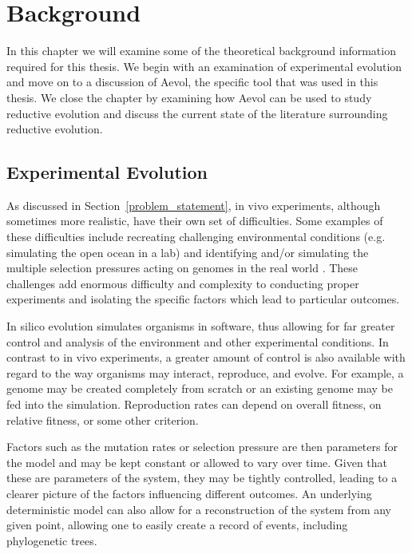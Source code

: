 \chapter{Background}\label{ch:background}
In this chapter we will examine some of the theoretical background information required for this thesis. We begin with an examination of experimental evolution and move on to a discussion of Aevol, the specific tool that was used in this thesis. We close the chapter by examining how Aevol can be used to study reductive evolution and discuss the current state of the literature surrounding reductive evolution.  

\section{Experimental Evolution}
As discussed in Section~\ref{problem_statement}, in vivo experiments, although sometimes more realistic, have their own set of difficulties. Some examples of these difficulties include recreating challenging environmental conditions (e.g. simulating the open ocean in a lab) and identifying and/or simulating the multiple selection pressures acting on genomes in the real world \cite{Batut.2013}. These challenges add enormous difficulty and complexity to conducting proper experiments and isolating the specific factors which lead to particular outcomes. 

In silico evolution simulates organisms in software, thus allowing for far greater control and analysis of the environment and other experimental conditions. In contrast to in vivo experiments, a greater amount of control is also available with regard to the way organisms may interact, reproduce, and evolve. For example, a genome may be created completely from scratch or an existing genome may be fed into the simulation. Reproduction rates can depend on overall fitness, on relative fitness, or some other criterion.

Factors such as the mutation rates or selection pressure are then parameters for the model and may be kept constant or allowed to vary over time. Given that these are parameters of the system, they may be tightly controlled, leading to a clearer picture of the factors influencing different outcomes. An underlying deterministic model can also allow for a reconstruction of the system from any given point, allowing one to easily create a record of events, including phylogenetic trees. 

